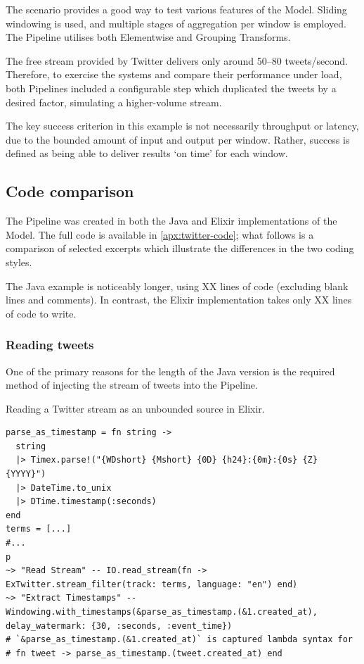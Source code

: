 The scenario provides a good way to test various features of the Model.
Sliding windowing is used, and multiple stages of aggregation per window is employed.
The Pipeline utilises both Elementwise and Grouping Transforms.

The free stream provided by Twitter delivers only around 50--80 tweets/second.
Therefore, to exercise the systems and compare their performance under load, both Pipelines included a configurable step which duplicated the tweets by a desired factor, simulating a higher-volume stream.

The key success criterion in this example is not necessarily throughput or latency, due to the bounded amount of input and output per window.
Rather, success is defined as being able to deliver results `on time' for each window.

\subsection{Code comparison}\label{sec:eval:twitter:code}

The Pipeline was created in both the Java and Elixir implementations of the Model.
The full code is available in \cref{apx:twitter-code}; what follows is a comparison of selected excerpts which illustrate the differences in the two coding styles.

The Java example is noticeably longer, using XX lines of code (excluding blank lines and comments).
In contrast, the Elixir implementation takes only XX lines of code to write.

\subsubsection{Reading tweets}

One of the primary reasons for the length of the Java version is the required method of injecting the stream of tweets into the Pipeline.

\begin{codelisting}
	\caption{Reading a Twitter stream as an unbounded source in Elixir.}
	\label{lst:eval:twitter-readstream-elixir}
	\begin{verbatim}
parse_as_timestamp = fn string ->
  string
  |> Timex.parse!("{WDshort} {Mshort} {0D} {h24}:{0m}:{0s} {Z} {YYYY}")
  |> DateTime.to_unix
  |> DTime.timestamp(:seconds)
end
terms = [...]
#...
p
~> "Read Stream" -- IO.read_stream(fn -> ExTwitter.stream_filter(track: terms, language: "en") end)
~> "Extract Timestamps" -- Windowing.with_timestamps(&parse_as_timestamp.(&1.created_at), delay_watermark: {30, :seconds, :event_time})
# `&parse_as_timestamp.(&1.created_at)` is captured lambda syntax for
# fn tweet -> parse_as_timestamp.(tweet.created_at) end
	\end{verbatim}
\end{codelisting}

